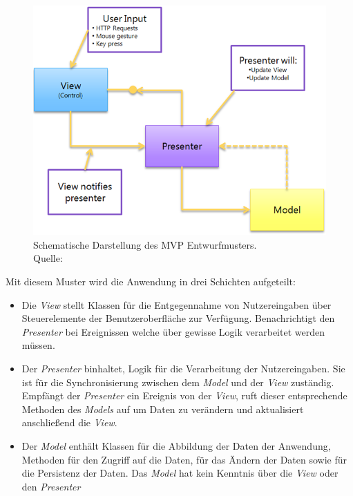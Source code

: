 \begin{figure}[H]
	\centering
	\includegraphics[width=1.0\textwidth]{resources/conception/mvp_pattern.png}
	\caption{Schematische Darstellung des MVP Entwurfmusters. \\Quelle: \cite{Valk2009}}
	\label{img:mvp_pattern}
\end{figure}

Mit diesem Muster wird die Anwendung in drei Schichten aufgeteilt:

\begin{itemize}
	\item{Die \textit{View} stellt Klassen für die Entgegennahme von Nutzereingaben über Steuerelemente der Benutzeroberfläche zur Verfügung. Benachrichtigt den \textit{Presenter} bei Ereignissen welche über gewisse Logik verarbeitet werden müssen.}
	\item{Der \textit{Presenter} binhaltet, Logik für die Verarbeitung der Nutzereingaben. Sie ist für die Synchronisierung zwischen dem \textit{Model} und der \textit{View} zuständig. Empfängt der \textit{Presenter} ein Ereignis von der \textit{View}, ruft dieser entsprechende Methoden des \textit{Models} auf um Daten zu verändern und aktualisiert anschließend die \textit{View}.}
	\item{Der \textit{Model} enthält Klassen für die Abbildung der Daten der Anwendung, Methoden für den Zugriff auf die Daten, für das Ändern der Daten sowie für die Persistenz der Daten. Das \textit{Model} hat kein Kenntnis über die \textit{View} oder den \textit{Presenter}}
\end{itemize}

